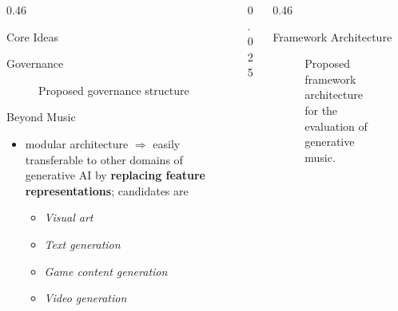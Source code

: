 \documentclass{beamer}
\begin{document}
\begin{frame}[t]
\begin{columns}[t]
\begin{column}{0.46\paperwidth}
\begin{block}{Core Ideas}
      \end{block}

      \begin{block}{Governance}
          \begin{figure}[!h]
            \centering
            \resizebox{.9\linewidth}{!}{}
            \caption{Proposed governance structure}
          \end{figure}
      \end{block}

      \begin{block}{Beyond Music}
          \begin{itemize}
            \item modular architecture $\Rightarrow$ easily transferable to other domains of generative AI by \textbf{replacing feature representations}; 
             candidates are
            \smallskip
            \begin{itemize}
              \item \textit{Visual art}
              \item \textit{Text generation}
              \item \textit{Game content generation}
              \item \textit{Video generation}
            \end{itemize}
          \end{itemize}
      \end{block}

    \end{column}
    
    \begin{column}{0.025\paperwidth}\end{column}
    
    \begin{column}{0.46\paperwidth}
      \begin{block}{Framework Architecture}
          \begin{figure}[!h]
            \centering
            \resizebox{.9\linewidth}{!}{}
            \caption{Proposed framework architecture for the evaluation of generative music.}
          \end{figure}
        

\end{block}
\end{column}
\end{columns}
\end{frame}
\end{document}
